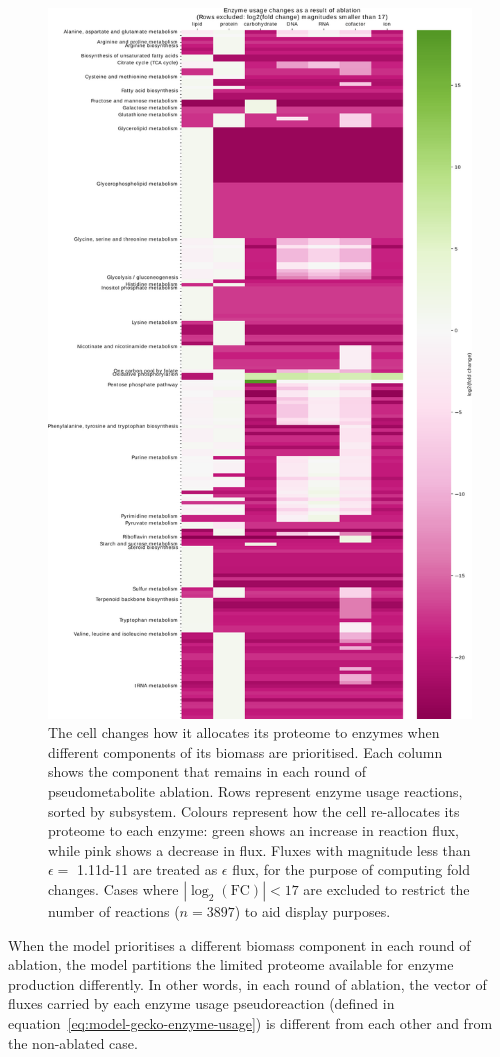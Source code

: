 \begin{figure}
  \centering
  \includegraphics[width=.8\linewidth]{allocation_fc}
  \caption{
    The cell changes how it allocates its proteome to enzymes when different components of its biomass are prioritised.
    Each column shows the component that remains in each round of pseudometabolite ablation.
    Rows represent enzyme usage reactions, sorted by subsystem.
    Colours represent how the cell re-allocates its proteome to each enzyme: green shows an increase in reaction flux, while pink shows a decrease in flux.
    Fluxes with magnitude less than $\epsilon = $ \SI{1.11d-11}{\mmolgdw} are treated as $\epsilon$ flux, for the purpose of computing fold changes.
    Cases where $|\log_{2}(\mathrm{FC})| < 17$ are excluded to restrict the number of reactions ($n = 3897$) to aid display purposes.
  }
  \label{fig:model-ablate-enz-use}
\end{figure}

When the model prioritises a different biomass component in each round of ablation, the model partitions the limited proteome available for enzyme production differently.
In other words, in each round of ablation, the vector of fluxes carried by each enzyme usage pseudoreaction (defined in equation~\ref{eq:model-gecko-enzyme-usage}) is different from each other and from the non-ablated case.


